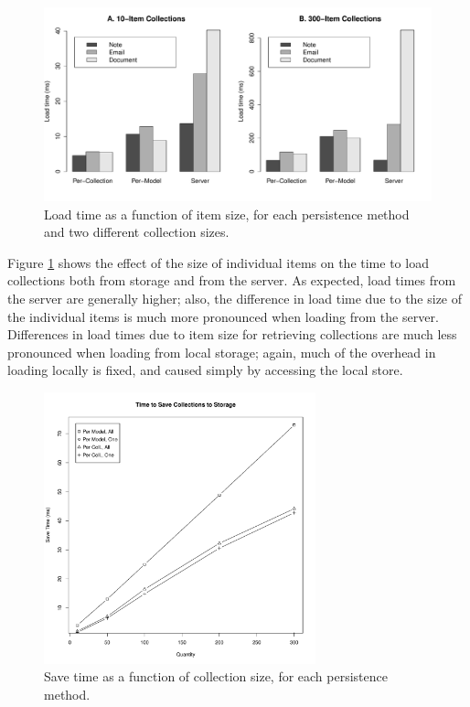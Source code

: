 \documentclass[12pt]{article}
\begin{document}
\begin{figure}[th]
  \centering
  \includegraphics[width=\textwidth]{bars.pdf}
  \caption{Load time as a function of item size, for each persistence method
  and two different collection sizes.}
  \label{fig:bar}
\end{figure}

Figure \ref{fig:bar} shows the effect of the size of individual items on the
time to load collections both from storage and from the server. As expected,
load times from the server are generally higher; also, the difference in load
time due to the size of the individual items is much more pronounced when
loading from the server. Differences in load times due to item size for
retrieving collections are much less pronounced when loading from local
storage; again, much of the overhead in loading locally is fixed, and caused
simply by accessing the local store.

\begin{figure}[th]
    \centering
    \includegraphics[width=0.7\textwidth]{save.pdf}
    \caption{Save time as a function of collection size, for each persistence
    method.}
    \label{fig:save}
\end{figure}
\end{document}
